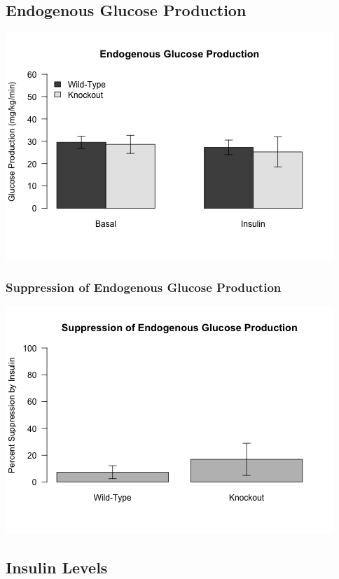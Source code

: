 \documentclass[]{article}
\begin{document}
\subsection{Endogenous Glucose
Production}\label{endogenous-glucose-production}

\includegraphics{figures/glucose-production-1.png}

\subsubsection{Suppression of Endogenous Glucose
Production}\label{suppression-of-endogenous-glucose-production}

\includegraphics{figures/sHGP-1.png}

\subsection{Insulin Levels}\label{insulin-levels}
\end{document}
